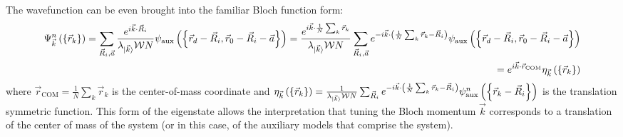 \documentclass[prb]{revtex4-2}
\begin{document}
The wavefunction can be even brought into the familiar Bloch function form:
\begin{equation}\begin{aligned}
	\Psi^n_{\vec k}\left(\left\{\vec r_k\right\}\right) = \sum_{\vec R_i, \vec a} \frac{e^{i \vec{k}\cdot\vec{R}_i}}{\lambda_{\ket{\vec k}} \mathcal{W} N} \psi_\text{aux}\left(\left\{ \vec r_d - \vec R_i, \vec r_0 - \vec R_i - \vec a \right\} \right) = \frac{e^{i \vec{k}\cdot\frac{1}{N}\sum_k \vec{r}_k}}{\lambda_{\ket{\vec k}} \mathcal{W} N}\sum_{\vec R_i, \vec a} e^{-i \vec{k}\cdot\left(\frac{1}{N}\sum_k\vec r_k - \vec{R}_i\right)} \psi_\text{aux}\left(\left\{ \vec r_d - \vec R_i, \vec r_0 - \vec R_i - \vec a \right\} \right) \\
	= e^{i \vec{k}\cdot\vec{r}_\text{COM}} \eta_{\vec k}\left(\left\{\vec r_k\right\}\right)
\end{aligned}\end{equation}
where \(\vec r_\text{COM} = \frac{1}{N}\sum_k \vec r_k\) is the center-of-mass coordinate and \(\eta_{\vec k}\left(\left\{\vec r_k\right\}\right) = \frac{1}{\lambda_{\ket{\vec k}} \mathcal{W} N}\sum_{\vec R_i} e^{-i \vec{k}\cdot\left(\frac{1}{N}\sum_k\vec r_k - \vec{R}_i\right)} \psi^n_\text{aux}\left(\left\{\vec r_k - \vec R_i\right\}\right)\) is the translation symmetric function. This form of the eigenstate allows the interpretation that tuning the Bloch momentum \(\vec k\) corresponds to a translation of the center of mass of the system (or in this case, of the auxiliary models that comprise the system).
\end{document}
